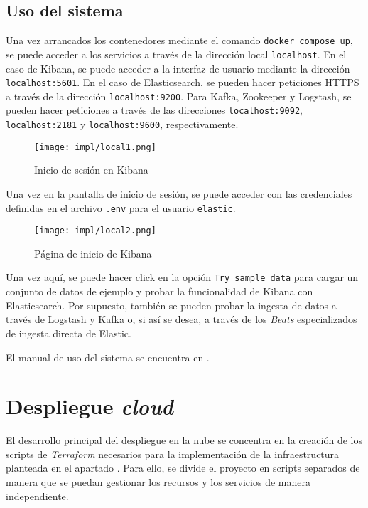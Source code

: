 \newpage{}
\subsection{Uso del sistema}
Una vez arrancados los contenedores mediante el comando
\texttt{docker compose up}, se puede acceder a los servicios a través de la
dirección local \texttt{localhost}. En el caso de Kibana, se puede acceder a
la interfaz de usuario mediante la dirección \texttt{localhost:5601}. En el
caso de Elasticsearch, se pueden hacer peticiones HTTPS a través de la dirección
\texttt{localhost:9200}. Para Kafka, Zookeeper y Logstash, se pueden hacer
peticiones a través de las direcciones \texttt{localhost:9092},
\texttt{localhost:2181} y \texttt{localhost:9600}, respectivamente.

\begin{figure}[H]
	\centering
	\texttt{[image: impl/local1.png]}
	\caption{Inicio de sesión en Kibana}
	\label{fig:kibana_login}
\end{figure}

Una vez en la pantalla de inicio de sesión, se puede acceder con las credenciales
definidas en el archivo \texttt{.env} para el usuario \texttt{elastic}.

\begin{figure}[H]
	\centering
	\texttt{[image: impl/local2.png]}
	\caption{Página de inicio de Kibana}
	\label{fig:kibana_start}
\end{figure}

Una vez aquí, se puede hacer click en la opción \texttt{Try sample data} para
cargar un conjunto de datos de ejemplo y probar la funcionalidad de Kibana con
Elasticsearch. Por supuesto, también se pueden probar la ingesta de datos a
través de Logstash y Kafka o, si así se desea, a través de los \textit{Beats}
especializados de ingesta directa de Elastic.

El manual de uso del sistema se encuentra en .

\newpage{}
\section{Despliegue \textit{cloud}}\label{sec:impl_cloud}
El desarrollo principal del despliegue en la nube se concentra en la creación
de los scripts de \textit{Terraform} necesarios para la implementación de la
infraestructura planteada en el apartado . Para ello,
se divide el proyecto en scripts separados de manera que se puedan gestionar
los recursos y los servicios de manera independiente.

